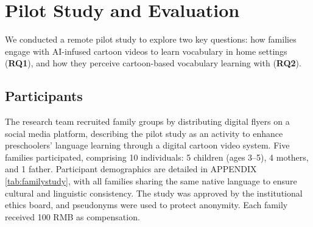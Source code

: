 \vspace*{-0.2cm}\section{Pilot Study and Evaluation}
We conducted a remote pilot study to explore two key questions: how families engage with AI-infused cartoon videos to learn vocabulary in home settings (\textbf{RQ1}), and how they perceive cartoon-based vocabulary learning with \name{} (\textbf{RQ2}).

\subsection{Participants}
The research team recruited family groups by distributing digital flyers on a social media platform, describing the pilot study as an activity to enhance preschoolers' language learning through a digital cartoon video system. Five families participated, comprising 10 individuals: 5 children (ages 3–5), 4 mothers, and 1 father. Participant demographics are detailed in APPENDIX \autoref{tab:familystudy}, with all families sharing the same native language to ensure cultural and linguistic consistency. The study was approved by the institutional ethics board, and pseudonyms were used to protect anonymity. Each family received 100 RMB as compensation.


